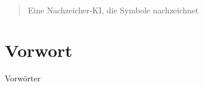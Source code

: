\begin{abstract}
Eine Nachzeicher-KI, die Symbole nachzeichnet
    
\end{abstract}

\newpage
\section*{Vorwort}
Vorwörter